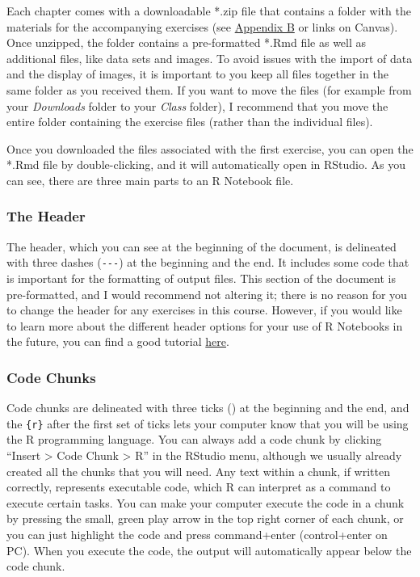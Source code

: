\documentclass[
]{book}
\begin{document}
Each chapter comes with a downloadable *.zip file that contains a folder with the materials for the accompanying exercises (see \href{r-exercises.html}{Appendix B} or links on Canvas). Once unzipped, the folder contains a pre-formatted *.Rmd file as well as additional files, like data sets and images. To avoid issues with the import of data and the display of images, it is important to you keep all files together in the same folder as you received them. If you want to move the files (for example from your \emph{Downloads} folder to your \emph{Class} folder), I recommend that you move the entire folder containing the exercise files (rather than the individual files).

Once you downloaded the files associated with the first exercise, you can open the *.Rmd file by double-clicking, and it will automatically open in RStudio. As you can see, there are three main parts to an R Notebook file.

\hypertarget{the-header}{%
\subsubsection*{The Header}\label{the-header}}

The header, which you can see at the beginning of the document, is delineated with three dashes (\texttt{-\/-\/-}) at the beginning and the end. It includes some code that is important for the formatting of output files. This section of the document is pre-formatted, and I would recommend not altering it; there is no reason for you to change the header for any exercises in this course. However, if you would like to learn more about the different header options for your use of R Notebooks in the future, you can find a good tutorial \href{https://bookdown.org/yihui/rmarkdown/html-document.html\#table-of-contents}{here}.

\hypertarget{code-chunks}{%
\subsubsection*{Code Chunks}\label{code-chunks}}

Code chunks are delineated with three ticks (\texttt{\textquotesingle{}\textquotesingle{}\textquotesingle{}}) at the beginning and the end, and the \texttt{\{r\}} after the first set of ticks lets your computer know that you will be using the R programming language. You can always add a code chunk by clicking ``Insert \textgreater{} Code Chunk \textgreater{} R'' in the RStudio menu, although we usually already created all the chunks that you will need. Any text within a chunk, if written correctly, represents executable code, which R can interpret as a command to execute certain tasks. You can make your computer execute the code in a chunk by pressing the small, green play arrow in the top right corner of each chunk, or you can just highlight the code and press command+enter (control+enter on PC). When you execute the code, the output will automatically appear below the code chunk.
\end{document}
